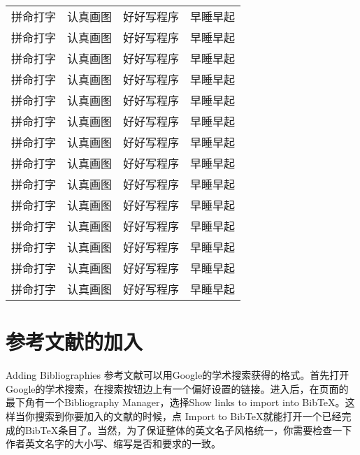\begin{longtable}[c]{llll}
        拼命打字&    认真画图&    好好写程序&    早睡早起\\
        拼命打字&    认真画图&    好好写程序&    早睡早起\\
        拼命打字&    认真画图&    好好写程序&    早睡早起\\
        拼命打字&    认真画图&    好好写程序&    早睡早起\\
        拼命打字&    认真画图&    好好写程序&    早睡早起\\
        拼命打字&    认真画图&    好好写程序&    早睡早起\\
        拼命打字&    认真画图&    好好写程序&    早睡早起\\
        拼命打字&    认真画图&    好好写程序&    早睡早起\\
        拼命打字&    认真画图&    好好写程序&    早睡早起\\
        拼命打字&    认真画图&    好好写程序&    早睡早起\\
        拼命打字&    认真画图&    好好写程序&    早睡早起\\
        拼命打字&    认真画图&    好好写程序&    早睡早起\\
        拼命打字&    认真画图&    好好写程序&    早睡早起\\
        拼命打字&    认真画图&    好好写程序&    早睡早起\\
\end{longtable}

\section{参考文献的加入}{Adding Bibliographies}
参考文献可以用Google的学术搜索获得\BibTeX{}的格式\citep{zhujianpin:2009}。首先打开Google的学术搜索，在搜索按钮边上有一个偏好设置的链接。进入后，在页面的最下角有一个Bibliography Manager，选择Show links to import 
into BibTeX。这样当你搜索到你要加入的文献的时候，点 Import to BibTeX就能打开一个已经完成的BibTeX条目了。当然，为了保证整体的英文名子风格统一，你需要检查一下作者英文名字的大小写、缩写是否和要求的一致。
